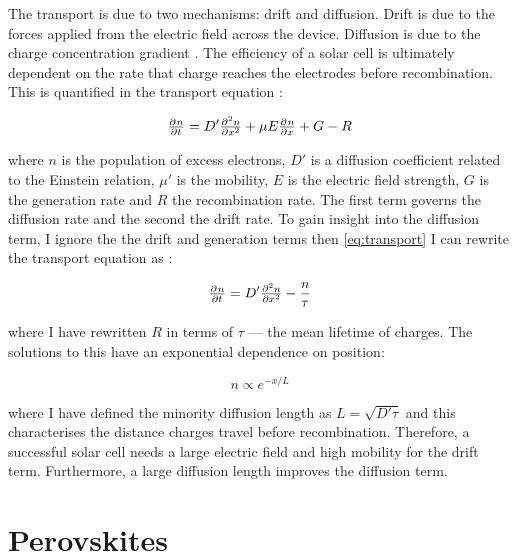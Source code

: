 \documentclass{physics_article_B}
\begin{document}
The transport is due to two mechanisms: drift and diffusion. Drift is due to the forces applied from the electric field across the device. Diffusion is due to the charge concentration gradient \cite{zhang_device_2017}. The efficiency of a solar cell is ultimately dependent on the rate that charge reaches the electrodes before recombination. This is quantified in the transport equation \cite{zhang_device_2017}:

\begin{equation}
 \label{eq:transport}
 \pd{n}{ t} = D'\pd[2]{n}{ x} + \mu E\pd{n}{x} + G - R
\end{equation}

where $n$ is the population of excess electrons, $D'$ is a diffusion coefficient related to the Einstein relation, $\mu'$ is the mobility, $E$ is the electric field strength, $G$ is the generation rate and $R$ the recombination rate. The first term governs the diffusion rate and the second the drift rate. To gain insight into the diffusion term, I ignore the the drift and generation terms then \cref{eq:transport} I can rewrite the transport equation as \cite{zhang_device_2017}:

\begin{equation}
 \label{eq:diffusion_rate}
 \pd{n}{ t} = D'\pd[2]{n}{ x} - \frac{n}{\tau}
\end{equation}

where I have rewritten $R$ in terms of $\tau$ --- the mean lifetime of charges. The solutions to this have an exponential dependence on position:

\begin{equation}
 \label{eq:diffusion_pop}
 n \propto e^{-x/L}
\end{equation}

where I have defined the minority diffusion length as $L = \sqrt{D'\tau}$ \cite{zhang_device_2017} and this characterises the distance charges travel before recombination. Therefore, a successful solar cell needs a large electric field and high mobility for the drift term. Furthermore, a large diffusion length improves the diffusion term.

\section*{Perovskites}
\end{document}
